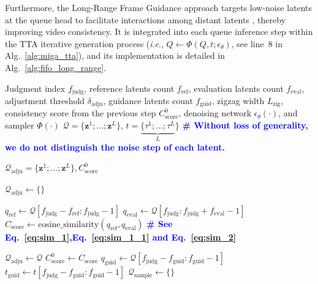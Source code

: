 \documentclass{article}
\theoremstyle{plain}
\theoremstyle{definition}
\theoremstyle{remark}
\newcommand{\ie}{\textit{i}.\textit{e}.}
\begin{document}
Furthermore, the Long-Range Frame Guidance approach targets low-noise latents at the queue head to facilitate interactions among distant latents \cite{feng2025cstrack}, thereby improving video consistency. It is integrated into each queue inference step within the TTA iterative generation process (\ie, $Q \gets \Phi(Q, t;\epsilon_{\theta})$, see line~8 in Alg.~\ref{alg:miga_tta}), and its implementation is detailed in Alg.~\ref{alg:fifo_long_range}.

\begin{algorithm}[htbp]
\caption{Self-reflection approach in MIGA}
\label{alg:miga_self_reflect}
\begin{algorithmic}[1]

 Judgment index $f_\mathrm{judg}$, reference latents count $f_\mathrm{ref}$, evaluation latents count $f_\mathrm{eval}$, adjustment threshold $\delta_\mathrm{adju}$, guidance latents count $f_\mathrm{guid}$, zigzag width $L_{\mathrm{zig}}$, consistency score from the previous step $C^0_\mathrm{score}$, denoising network $\epsilon_{\theta}(\cdot)$, and sampler $\Phi(\cdot)$
 $\mathcal{Q} = \{\mathbf{z}^1; \dots; \mathbf{z}^L\}$, $t = \underbrace{\{\tau^1; \dots; \tau^L}_{L}\}$ {\bfseries \textcolor{blue}{\# Without loss of generality, we do not distinguish the noise step of each latent.}}

 $\mathcal{Q}_\mathrm{adju} = \{\mathbf{z}^1; \dots; \mathbf{z}^L\}, C^0_\mathrm{score}$

\STATE $\mathcal{Q}_\mathrm{adju} \gets \{\}$
\STATE {\bfseries \textcolor{blue}{\# Evaluation}}

\STATE $q_\mathrm{ref} \gets \mathcal{Q}[f_\mathrm{judg} - f_\mathrm{ref}: f_\mathrm{judg} - 1]$ 
\STATE $q_\mathrm{eval} \gets \mathcal{Q}[f_\mathrm{judg}: f_\mathrm{judg} + f_\mathrm{eval} - 1]$ 
\STATE $C_\mathrm{score} \gets \mathrm{cosine\_similarity}(q_\mathrm{ref}, q_\mathrm{eval})$ {\bfseries \textcolor{blue}{\# See Eq.~\ref{eq:sim_1},Eq.~\ref{eq:sim_1_1} and Eq.~\ref{eq:sim_2}}}

    \STATE {\bfseries \textcolor{blue}{\# Do not perform extended sampling.}}
    \STATE $\mathcal{Q}_\mathrm{adju} \gets \mathcal{Q}$
    \STATE $C^0_\mathrm{score} \gets C_\mathrm{score}$
\ELSE
    \STATE {\bfseries \textcolor{blue}{\# Perform extended sampling.}}
    \STATE $q_\mathrm{guid} \gets \mathcal{Q}[f_\mathrm{judg} - f_\mathrm{guid}: f_\mathrm{guid} - 1]$ 
    \STATE $t_\mathrm{guid} \gets t[f_\mathrm{judg} - f_\mathrm{guid}: f_\mathrm{guid} - 1]$ 
    \STATE $\mathcal{Q}_\mathrm{sample} \gets \{\}$
    

\end{algorithmic}
\end{algorithm}
\end{document}
